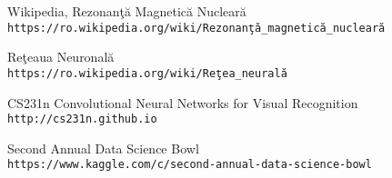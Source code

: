 \begin{thebibliography}{9} 

Wikipedia, Rezonan\c{t}\u{a} Magnetic\u{a} Nuclear\u{a}
\\\texttt{https://ro.wikipedia.org/wiki/Rezonan\c{t}\u{a}\_magnetic\u{a}\_nuclear\u{a}}

Re\c{t}eaua Neuronal\u{a}
\\\texttt{https://ro.wikipedia.org/wiki/Re\c{t}ea\_neural\u{a}}

CS231n Convolutional Neural Networks for Visual Recognition
\\\texttt{http://cs231n.github.io}

Second Annual Data Science Bowl
\\\texttt{https://www.kaggle.com/c/second-annual-data-science-bowl}

\end{thebibliography}